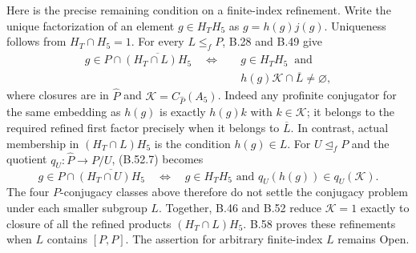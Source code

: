 Here is the precise remaining condition on a finite-index
refinement.  Write the unique factorization of an element
$g\in H_TH_5$ as $g=h(g)j(g)$.
Uniqueness follows from $H_T\cap H_5=1$.
For every $L\leq_f P$, B.28 and B.49 give
\[
 \begin{split}
 g\in P\cap\overline{(H_T\cap L)H_5}
 \quad\Longleftrightarrow\quad
 &g\in H_TH_5\ \text{ and }\\[-1mm]
 &h(g)\mathcal K\cap\overline L\ne\varnothing,
 \end{split}
 \tag{B.52.7}
\]
where closures are in $\widehat P$ and
$\mathcal K=C_{\widehat P}(A_5)$.
Indeed any profinite conjugator for the same embedding as
$h(g)$ is exactly $h(g)k$ with $k\in\mathcal K$;
it belongs to the required refined first factor precisely
when it belongs to $\overline L$.
In contrast, actual membership in $(H_T\cap L)H_5$ is
the condition $h(g)\in L$.
For $U\trianglelefteq_f P$ and the quotient
$q_U:\widehat P\to P/U$, (B.52.7) becomes
\[
 g\in P\cap\overline{(H_T\cap U)H_5}
 \quad\Longleftrightarrow\quad
 g\in H_TH_5\text{ and }q_U(h(g))\in q_U(\mathcal K).
 \tag{B.52.8}
\]
The four $P$-conjugacy classes above therefore do not settle
the conjugacy problem under each smaller subgroup $L$.
Together, B.46 and B.52 reduce $\mathcal K=1$ exactly to
closure of all the refined products $(H_T\cap L)H_5$.
B.58 proves these refinements when $L$ contains $[P,P]$.
The assertion for arbitrary finite-index $L$ remains Open.
